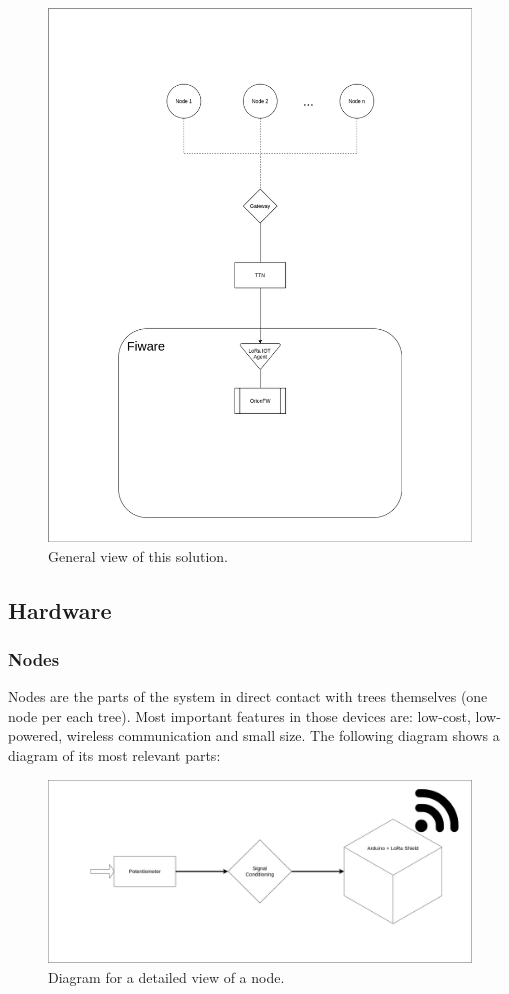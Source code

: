 \documentclass[11pt,a4paper,dvipsnames,twoside]{article}
\begin{document}
\begin{figure}[htp]
  \centering
  \includegraphics[width=.73\textwidth]{../schemes/main_scheme_tbg.png}
  \caption{General view of this solution.}
  \label{fig:GenView}
\end{figure}

\subsection{Hardware}

\subsubsection{Nodes}
Nodes are the parts of the system in direct contact with trees themselves (one node per each tree). Most important features in those devices are: low-cost, low-powered, wireless communication and small size. The following diagram shows a diagram of its most relevant parts:

\begin{figure}[htp]
  \centering
  \includegraphics[width=.9\textwidth]{../schemes/node_tbg.png}
  \caption{Diagram for a detailed view of a node.}
  \label{fig:NodeDiag}
\end{figure}
\end{document}
